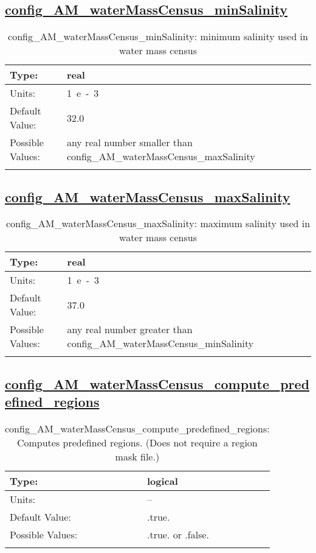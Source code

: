 \subsection[config\_AM\_waterMassCensus\_minSalinity]{\hyperref[sec:nm_tab_AM_waterMassCensus]{config\_AM\_waterMassCensus\_minSalinity}}
\label{subsec:nm_sec_config_AM_waterMassCensus_minSalinity}
\begin{center}
\begin{longtable}{| p{2.0in} || p{4.0in} |}
    \hline
    Type: & real \\
    \hline
    Units: & \si{1.e-3} \\
    \hline
    Default Value: & 32.0 \\
    \hline
    Possible Values: & any real number smaller than config\_AM\_waterMassCensus\_maxSalinity \\
    \hline
    \caption{config\_AM\_waterMassCensus\_minSalinity: minimum salinity used in water mass census}
\end{longtable}
\end{center}
\subsection[config\_AM\_waterMassCensus\_maxSalinity]{\hyperref[sec:nm_tab_AM_waterMassCensus]{config\_AM\_waterMassCensus\_maxSalinity}}
\label{subsec:nm_sec_config_AM_waterMassCensus_maxSalinity}
\begin{center}
\begin{longtable}{| p{2.0in} || p{4.0in} |}
    \hline
    Type: & real \\
    \hline
    Units: & \si{1.e-3} \\
    \hline
    Default Value: & 37.0 \\
    \hline
    Possible Values: & any real number greater than config\_AM\_waterMassCensus\_minSalinity \\
    \hline
    \caption{config\_AM\_waterMassCensus\_maxSalinity: maximum salinity used in water mass census}
\end{longtable}
\end{center}
\subsection[config\_AM\_waterMassCensus\_compute\_predefined\_regions]{\hyperref[sec:nm_tab_AM_waterMassCensus]{config\_AM\_waterMassCensus\_compute\_predefined\_regions}}
\label{subsec:nm_sec_config_AM_waterMassCensus_compute_predefined_regions}
\begin{center}
\begin{longtable}{| p{2.0in} || p{4.0in} |}
    \hline
    Type: & logical \\
    \hline
    Units: & -- \\
    \hline
    Default Value: & .true. \\
    \hline
    Possible Values: & .true. or .false. \\
    \hline
    \caption{config\_AM\_waterMassCensus\_compute\_predefined\_regions: Computes predefined regions. (Does not require a region mask file.)}
\end{longtable}
\end{center}
